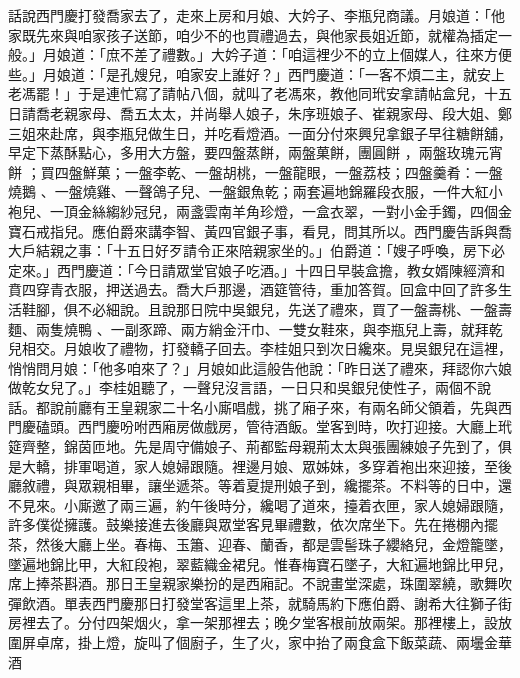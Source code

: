 \begin{showcontents}{}
話說西門慶打發喬家去了，走來上房和月娘、大妗子、李瓶兒商議。月娘道：「他家既先來與咱家孩子送節，咱少不的也買禮過去，與他家長姐近節，就權為插定一般。」月娘道：「庶不差了禮數。」大妗子道：「咱這裡少不的立上個媒人，往來方便些。」月娘道：「是孔嫂兒，咱家安上誰好？」西門慶道：「一客不煩二主，就安上老馮罷！」于是連忙寫了請帖八個，就叫了老馮來，教他同玳安拿請帖盒兒，十五日請喬老親家母、喬五太太，并尚舉人娘子，朱序班娘子、崔親家母、段大姐、鄭三姐來赴席，與李瓶兒做生日，并吃看燈酒。一面分付來興兒拿銀子早往糖餅舖，早定下蒸酥點心，多用大方盤，要四盤蒸餅，兩盤菓餅，團圓餅 ，兩盤玫瑰元宵餅 ；買四盤鮮菓；一盤李乾、一盤胡桃，一盤龍眼，一盤荔枝；四盤羹肴：一盤燒鵝 、一盤燒雞、一聲鴿子兒、一盤銀魚乾；兩套遍地錦羅段衣服，一件大紅小袍兒、一頂金絲縐紗冠兒，兩盞雲南羊角珍燈，一盒衣翠，一對小金手鐲，四個金寶石戒指兒。應伯爵來講李智、黃四官銀子事，看見，問其所以。西門慶告訴與喬大戶結親之事：「十五日好歹請令正來陪親家坐的。」伯爵道：「嫂子呼喚，房下必定來。」西門慶道：「今日請眾堂官娘子吃酒。」十四日早裝盒擔，教女婿陳經濟和賁四穿青衣服，押送過去。喬大戶那邊，酒筵管待，重加答賀。回盒中回了許多生活鞋腳，俱不必細說。且說那日院中吳銀兒，先送了禮來，買了一盤壽桃、一盤壽麵、兩隻燒鴨 、一副豕蹄、兩方綃金汗巾、一雙女鞋來，與李瓶兒上壽，就拜乾兒相交。月娘收了禮物，打發轎子回去。李桂姐只到次日纔來。見吳銀兒在這裡，悄悄問月娘：「他多咱來了？」月娘如此這般告他說：「昨日送了禮來，拜認你六娘做乾女兒了。」李桂姐聽了，一聲兒沒言語，一日只和吳銀兒使性子，兩個不說話。都說前廳有王皇親家二十名小廝唱戲，挑了廂子來，有兩名師父領着，先與西門慶磕頭。西門慶吩咐西廂房做戲房，管待酒飯。堂客到時，吹打迎接。大廳上玳筵齊整，錦茵匝地。先是周守備娘子、荊都監母親荊太太與張團練娘子先到了，俱是大轎，排軍喝道，家人媳婦跟隨。裡邊月娘、眾姊妹，多穿着袍出來迎接，至後廳敘禮，與眾親相畢，讓坐遞茶。等着夏提刑娘子到，纔擺茶。不料等的日中，還不見來。小廝邀了兩三遍，約午後時分，纔喝了道來，擡着衣匣，家人媳婦跟隨，許多僕從擁護。鼓樂接進去後廳與眾堂客見畢禮數，依次席坐下。先在捲棚內擺茶，然後大廳上坐。春梅、玉簫、迎春、蘭香，都是雲髻珠子纓絡兒，金燈籠墜，墜遍地錦比甲，大紅段袍，翠藍織金裙兒。惟春梅寶石墜子，大紅遍地錦比甲兒，席上捧茶斟酒。那日王皇親家樂扮的是西廂記。不說畫堂深處，珠圍翠繞，歌舞吹彈飲酒。單表西門慶那日打發堂客這里上茶，就騎馬約下應伯爵、謝希大往獅子街房裡去了。分付四架烟火，拿一架那裡去；晚夕堂客根前放兩架。那裡樓上，設放圍屏卓席，掛上燈，旋叫了個廚子，生了火，家中抬了兩食盒下飯菜蔬、兩壜金華酒 
\end{showcontents}
